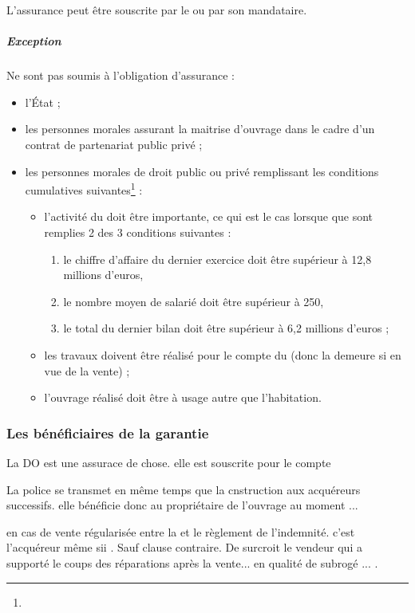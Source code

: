			L’assurance peut être souscrite par le \MO ou par son mandataire.

			\subparagraph{Exception} Ne sont pas soumis à l’obligation d’assurance  :
				\begin{itemize}
				\item l'État ;
				\item les personnes morales assurant la maitrise d’ouvrage dans le cadre d’un contrat de partenariat public privé ;
				\item les personnes morales de droit public ou privé remplissant les conditions cumulatives suivantes\footnote{} :
					\begin{itemize}
						\item l'activité du \Mo doit être importante, ce qui est le cas lorsque que sont remplies 2 des 3 conditions suivantes :
						\begin{enumerate}
							\item le chiffre d'affaire du dernier exercice doit être supérieur à 12,8 millions d'euros,
							\item le nombre moyen de salarié doit être supérieur à 250,
							\item le total du dernier bilan doit être supérieur à 6,2 millions d'euros ;
						\end{enumerate}
					\item les travaux doivent être réalisé pour le compte du \Mo (donc la \DO demeure si en vue de la vente) ;
					\item l'ouvrage réalisé doit être à usage autre que l'habitation.
					\end{itemize}
				\end{itemize}

		\subsubsection{Les bénéficiaires de la garantie}

			La DO est une assurace de chose. elle est souscrite pour le compte

			La police se transmet en même temps que la cnstruction aux acquéreurs successifs. elle bénéficie donc au propriétaire de l'ouvrage au moment ...

			en cas de vente régularisée entre la et le règlement de l'indemnité. c'est l'acquéreur même sii . Sauf clause contraire. De surcroit le vendeur qui a supporté le coups des réparations après la vente... en qualité de subrogé ... .

